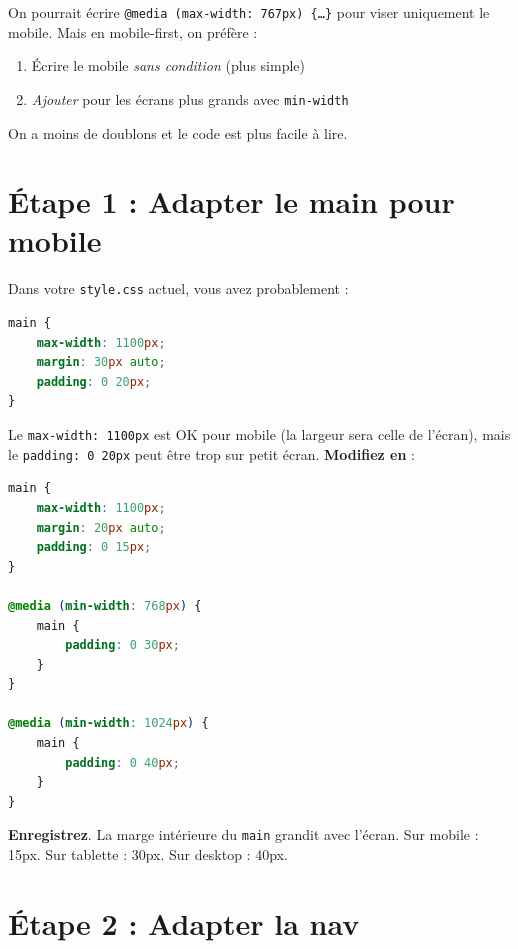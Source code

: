 \documentclass[11pt,a4paper]{article}
\newcommand{\cmark}{\ding{51}}
\begin{document}
\begin{infobox}
On pourrait écrire \texttt{@media (max-width: 767px) \{\ldots\}} pour
viser uniquement le mobile. Mais en mobile-first, on préfère :
\begin{enumerate}[nosep]
    \item Écrire le mobile \emph{sans condition} (plus simple)
    \item \emph{Ajouter} pour les écrans plus grands avec \texttt{min-width}
\end{enumerate}
On a moins de doublons et le code est plus facile à lire.
\end{infobox}

\newpage

\section{Étape 1 : Adapter le main pour mobile}

Dans votre \texttt{style.css} actuel, vous avez probablement :

\begin{lstlisting}[language=CSS]
main {
    max-width: 1100px;
    margin: 30px auto;
    padding: 0 20px;
}
\end{lstlisting}

Le \texttt{max-width: 1100px} est OK pour mobile (la largeur sera celle
de l'écran), mais le \texttt{padding: 0 20px} peut être trop sur petit
écran. \textbf{Modifiez en} :

\begin{lstlisting}[language=CSS]
main {
    max-width: 1100px;
    margin: 20px auto;
    padding: 0 15px;
}

@media (min-width: 768px) {
    main {
        padding: 0 30px;
    }
}

@media (min-width: 1024px) {
    main {
        padding: 0 40px;
    }
}
\end{lstlisting}

\textbf{Enregistrez}. La marge intérieure du \texttt{main} grandit avec
l'écran. Sur mobile : 15px. Sur tablette : 30px. Sur desktop : 40px. \cmark

\section{Étape 2 : Adapter la nav}
\end{document}
